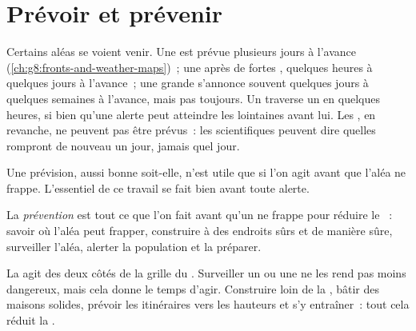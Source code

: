 \section{Prévoir et prévenir}

Certains aléas se voient venir. Une  est prévue plusieurs jours à
l'avance (\cref{ch:g8:fronts-and-weather-maps})~; une  après de
fortes , quelques heures à quelques jours à l'avance~; une grande
 s'annonce souvent quelques jours à quelques semaines à l'avance,
mais pas toujours. Un  traverse un  en quelques heures, si
bien qu'une alerte peut atteindre les  lointaines avant lui. Les
, en revanche, ne peuvent pas être prévus~: les scientifiques
peuvent dire quelles  rompront de nouveau un jour, jamais quel
jour.

Une prévision, aussi bonne soit-elle, n'est utile que si l'on agit avant
que l'aléa ne frappe. L'essentiel de ce travail se fait bien avant toute
alerte.

\begin{definition}[Prévention]\label{def:g9:natural-risks:prevention}
La \emph{prévention} est tout ce que l'on fait avant qu'un  ne frappe pour réduire le ~: savoir où l'aléa peut frapper,
construire à des endroits sûrs et de manière sûre, surveiller l'aléa,
alerter la population et la préparer.
\end{definition}

La  agit des deux côtés de la grille du . Surveiller un
 ou une  ne les rend pas moins dangereux, mais cela donne le
temps d'agir. Construire loin de la , bâtir des maisons
solides, prévoir les itinéraires vers les hauteurs et s'y entraîner~:
tout cela réduit la .

